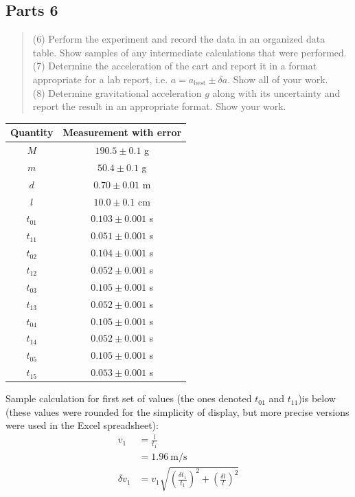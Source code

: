 \documentclass[10pt]{extarticle}
\newcommand{\plain}[1]{\textrm{#1}}
\begin{document}
{\subsection*{Parts 6}
\begin{quote}
	(6) Perform the experiment and record the data in an organized data table. Show samples of any intermediate calculations that were performed. \\
	(7) Determine the acceleration of the cart and report it in a format appropriate for a lab report, i.e. $ a = a_{\plain{best}} \pm \delta a $.  Show all of your work. \\
	(8) Determine gravitational acceleration $ g $ along with its uncertainty and report the result in an appropriate format.  Show your work.
\end{quote}
\begin{center}
	\begin{tabular}{c|c}
		Quantity & Measurement with error \\
		\hline
		$ M $ & $190.5 \pm 0.1$ g\\
		$ m $ & $50.4 \pm 0.1$ g \\
		$d$ & $0.70 \pm 0.01$ m  \\
		$l$ & $10.0 \pm 0.1$ cm \\
		\hline
		$t_{01}$ & $0.103 \pm 0.001$ s \\
		$t_{11}$ & $0.051 \pm 0.001$ s \\
		$t_{02}$ & $0.104 \pm 0.001$ s \\
		$t_{12}$ & $0.052 \pm 0.001$ s\\
		$t_{03}$ & $0.105 \pm 0.001$ s \\
		$t_{13}$ & $0.052 \pm 0.001$ s \\
		$t_{04}$ & $0.105 \pm 0.001$ s\\
		$t_{14}$ & $0.052 \pm 0.001$ s \\
		$t_{05}$ & $0.105 \pm 0.001$ s \\
		$t_{15}$ & $0.053 \pm 0.001$ s  
	\end{tabular}
\end{center}
Sample calculation for first set of values (the ones denoted $t_{01}$ and $t_{11}$)is below (these values were rounded for the simplicity of display, but more precise versions were used in the Excel spreadsheet):
\begin{align*}
	v_1 &= \frac{l}{t_1} \\
	&= 1.96~\plain{m/s} \\
	\delta v_1 &= v_1\sqrt{\left(\frac{\delta t_1}{t_1}\right)^2 + \left(\frac{\delta l}{l}\right)^2} \\

\end{align*}}
\end{document}
